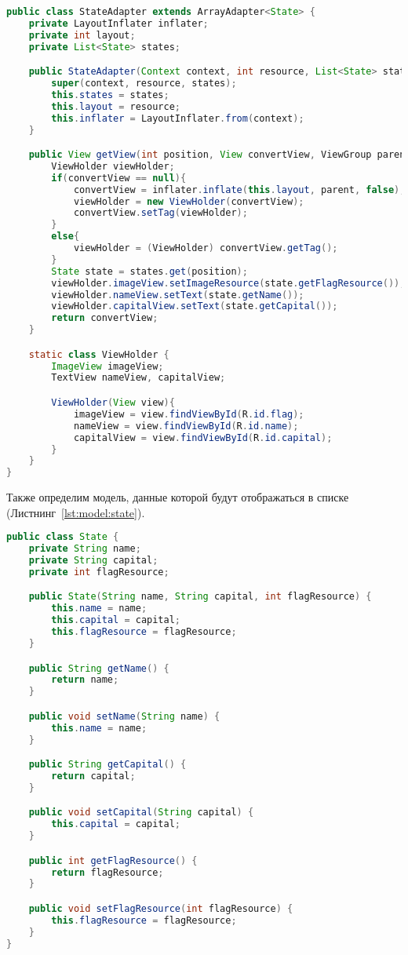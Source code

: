 \begin{lstlisting}[language=Java
	, label=lst:adapter:list:state
	]
public class StateAdapter extends ArrayAdapter<State> {
	private LayoutInflater inflater;
	private int layout;
	private List<State> states;

	public StateAdapter(Context context, int resource, List<State> states) {
		super(context, resource, states);
		this.states = states;
		this.layout = resource;
		this.inflater = LayoutInflater.from(context);
	}

	public View getView(int position, View convertView, ViewGroup parent) {
		ViewHolder viewHolder;
		if(convertView == null){
			convertView = inflater.inflate(this.layout, parent, false);
			viewHolder = new ViewHolder(convertView);
			convertView.setTag(viewHolder);
		}
		else{
			viewHolder = (ViewHolder) convertView.getTag();
		}
		State state = states.get(position);
		viewHolder.imageView.setImageResource(state.getFlagResource());
		viewHolder.nameView.setText(state.getName());
		viewHolder.capitalView.setText(state.getCapital());
		return convertView;
	}

	static class ViewHolder {
		ImageView imageView;
		TextView nameView, capitalView;

		ViewHolder(View view){
			imageView = view.findViewById(R.id.flag);
			nameView = view.findViewById(R.id.name);
			capitalView = view.findViewById(R.id.capital);
		}
	}
}
\end{lstlisting}

Также определим модель, данные которой будут отображаться в списке
(Листнинг~\ref{lst:model:state}).

\begin{lstlisting}[language=Java
	, label=lst:model:state
	]
public class State {
	private String name;
	private String capital;
	private int flagResource;

	public State(String name, String capital, int flagResource) {
		this.name = name;
		this.capital = capital;
		this.flagResource = flagResource;
	}

	public String getName() {
		return name;
	}

	public void setName(String name) {
		this.name = name;
	}

	public String getCapital() {
		return capital;
	}

	public void setCapital(String capital) {
		this.capital = capital;
	}

	public int getFlagResource() {
		return flagResource;
	}

	public void setFlagResource(int flagResource) {
		this.flagResource = flagResource;
	}
}
\end{lstlisting}

